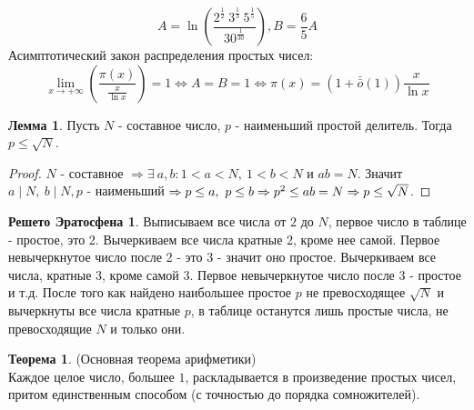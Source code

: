 \documentclass[a4paper, 12pt]{article}
\newcommand{\lra}{\Leftrightarrow}
\renewcommand{\div}{\mid}
\newcommand{\om}{\bar{\bar{o}}}
\theoremstyle{definition}
\newtheorem{theorem}{Теорема}[section]
\newtheorem{lemma}{Лемма}[section]
\newtheorem*{eratosphene}{Решето Эратосфена}
\begin{document}
    $$A=\ln (\frac{2^{\frac{1}{2}} \ 3^{\frac{1}{3}} \ 5^{\frac{1}{5}}}{30^{\frac{1}{30}}}), B=\frac{6}{5}A$$
    Асимптотический закон распределения простых чисел:
    $$\lim\limits_{x\to +\infty}(\frac{\pi(x)}{\frac{x}{\ln x}})=1 \lra A=B=1 \lra \pi(x)=(1+\om(1))\frac{x}{\ln x}$$
    \begin{lemma} \label{lemma5.2}
        Пусть $N$ - составное число, $p$ - наименьший простой делитель. Тогда $p\leq \sqrt{N}$.
    \end{lemma} 
    \begin{proof}
        $N$ - составное $\Rightarrow \exists\ a,b: 1<a<N,\ 1<b<N$ и $ab=N$. Значит $a\div N,\ b\div N, p$ - наименьший $\Rightarrow p\leq a,\ p\leq b \Rightarrow p^2\leq ab=N\\
        \Rightarrow p\leq \sqrt{N}$.
     \end{proof}
    \begin{eratosphene}
        Выписываем все числа от $2$ до $N$, первое число в таблице - простое, это 2. Вычеркиваем все числа кратные 2, кроме нее самой. Первое невычеркнутое число после 2 - это 3 - значит оно простое. Вычеркиваем все числа, кратные 3, кроме самой 3. Первое невычеркнутое число после 3 - простое и т.д. После того как найдено наибольшее простое $p$ не превосходящее $\sqrt{N}$ и вычеркнуты все числа кратные $p$, в таблице останутся лишь простые числа, не превосходящие $N$ и только они.
    \end{eratosphene}
    \begin{theorem} \label{th5.2}
        (Основная теорема арифметики)\\
        Каждое целое число, большее $1$, раскладывается в произведение простых чисел, притом единственным способом (с точностью до порядка сомножителей). 
    \end{theorem}
\end{document}
